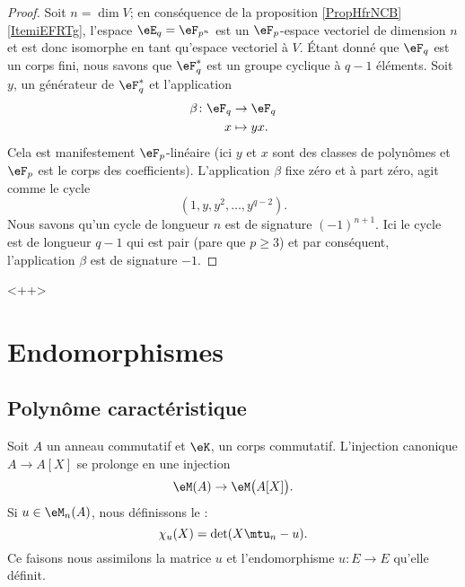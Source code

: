 \begin{proof}
    Soit \( n=\dim V\); en conséquence de la proposition \ref{PropHfrNCB}\ref{ItemiEFRTg}, l'espace \( \eE_q=\eF_{p^n}\) est un \( \eF_p\)-espace vectoriel de dimension \( n\) et est donc isomorphe en tant qu'espace vectoriel à \( V\). Étant donné que \( \eF_q\) est un corps fini, nous savons que \( \eF_q^*\) est un groupe cyclique à \( q-1\) éléments. Soit \( y\), un générateur de \( \eF_q^*\) et l'application
    \begin{equation}
        \begin{aligned}
            \beta\colon \eF_q&\to \eF_q \\
            x&\mapsto yx. 
        \end{aligned}
    \end{equation}
    Cela est manifestement \( \eF_p\)-linéaire (ici \( y\) et \( x\) sont des classes de polynômes et \( \eF_p\) est le corps des coefficients). L'application \( \beta\) fixe zéro et à part zéro, agit comme le cycle
    \begin{equation}
        (1,y,y^2,\ldots, y^{q-2}).
    \end{equation}
    Nous savons qu'un cycle de longueur \( n\) est de signature \( (-1)^{n+1}\). Ici le cycle est de longueur \( q-1\) qui est pair (pare que \( p\geq 3\)) et par conséquent, l'application \( \beta\) est de signature \( -1\).
\end{proof}
<++>

\section{Endomorphismes}

\subsection{Polynôme caractéristique}

Soit \( A\) un anneau commutatif et \( \eK\), un corps commutatif. L'injection canonique \( A\to A[X]\) se prolonge en une injection
\begin{equation}
   \eM(A)\to\eM\big( A[X] \big).
\end{equation}
Si \( u\in\eM_n(A)\), nous définissons le  :
\begin{equation}
    \chi_u(X)=\det(X\mtu_n-u).
\end{equation} 
Ce faisons nous assimilons la matrice \( u\) et l'endomorphisme \( u\colon E\to E\) qu'elle définit. 

